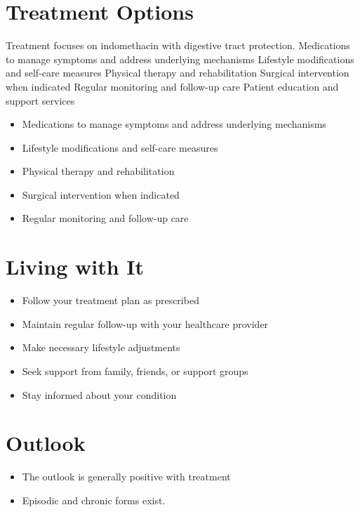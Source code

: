 \section{Treatment Options}
Treatment focuses on indomethacin with digestive tract protection. Medications to manage symptoms and address underlying mechanisms Lifestyle modifications and self-care measures Physical therapy and rehabilitation Surgical intervention when indicated Regular monitoring and follow-up care Patient education and support services

\begin{itemize}[noitemsep]
  \item Medications to manage symptoms and address underlying mechanisms
  \item Lifestyle modifications and self-care measures
  \item Physical therapy and rehabilitation
  \item Surgical intervention when indicated
  \item Regular monitoring and follow-up care
\end{itemize}
\section{Living with It}
\begin{itemize}[noitemsep]
  \item Follow your treatment plan as prescribed
  \item Maintain regular follow-up with your healthcare provider
  \item Make necessary lifestyle adjustments
  \item Seek support from family, friends, or support groups
  \item Stay informed about your condition
\end{itemize}
\section{Outlook}
\begin{itemize}[noitemsep]
  \item The outlook is generally positive with treatment
  \item Episodic and chronic forms exist.
\end{itemize}
